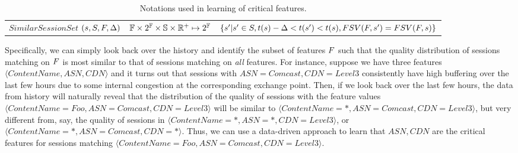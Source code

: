 \begin{table}[t!]
\begin{tabular}{p{3.5cm}|p{3cm}|p{7.5cm}}
$SimilarSessionSet$ $(s,S,F,\Delta)$ & $\mathbb{F}\times2^\mathbb{F}\times\mathbb{S}\times\mathbb{R}^{+}\mapsto2^\mathbb{F}$ & $\{s'|s'\in S,t(s)-\Delta<t(s')<t(s),FSV(F,s')=FSV(F,s)\}$ \\ 
\end{tabular}
\caption{Notations used in learning of critical features.}
\label{tab:terminology}
\end{table}



Specifically, we can simply look back over the history and identify  
the subset of features $F$ such that the quality 
distribution of sessions matching on $F$ is most similar 
to that of sessions matching on {\em all} features.   
For instance, suppose we have three features
$\langle \mathit{ContentName},\mathit{ASN},\mathit{CDN}\rangle$ and 
it turns out that sessions with  $\mathit{ASN}=\mathit{Comcast},
\mathit{CDN}=\mathit{Level3}$ consistently
have  high buffering over the last few hours due to some internal 
congestion at the corresponding exchange point. 
Then, if we look back over the last few hours, the data from 
history will   naturally reveal  that the distribution of the quality of 
sessions  with the feature values
$\langle\mathit{ContentName}=\mathit{Foo},
\mathit{ASN}=\mathit{Comcast},\mathit{CDN}=\mathit{Level3}\rangle$
will be  similar to $\langle \mathit{ContentName}=\mathit{*},
\mathit{ASN}=\mathit{Comcast},\mathit{CDN}=\mathit{Level3} \rangle$, 
but very different from, say, the quality of sessions in 
$\langle \mathit{ContentName}=\mathit{*},\mathit{ASN}=\mathit{*},
\mathit{CDN}=\mathit{Level3} \rangle$,
or $\langle \mathit{ContentName}=\mathit{*},
\mathit{ASN}=\mathit{Comcast},\mathit{CDN}=\mathit{*} \rangle$.
Thus, we can use a data-driven approach to learn that 
$\mathit{ASN},\mathit{CDN}$ are the critical features for sessions 
matching $\langle \mathit{ContentName}=\mathit{Foo},
\mathit{ASN}=\mathit{Comcast},\mathit{CDN}=\mathit{Level3} \rangle$.




  



